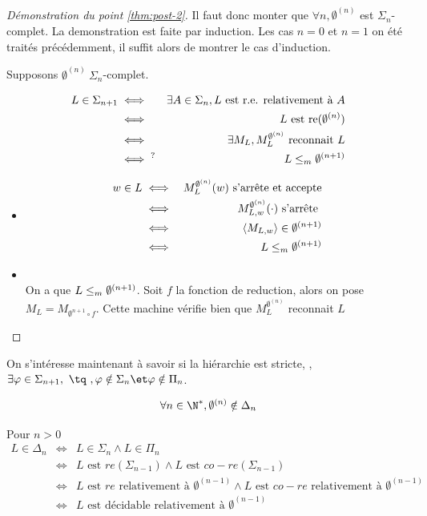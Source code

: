 \begin{proof}[Démonstration du point \ref{thm:post-2}]
	Il faut donc monter que $\forall n, \emptyset^{(n)}$ est $\Sigma_n$-complet.
	La demonstration est faite par induction. Les cas $n =0$ et $n=1$ on été traités précédemment, il suffit alors de montrer le cas d'induction.

	Supposons $\emptyset^{(n)} \ \Sigma_n$-complet.

	\begin{eqnarray*}
		L \in \Sigma_{n+1} &\iff& \exists A \in \Sigma_n, L \text { est r.e. relativement à } A \\
		&\iff& L \text{ est re}(\emptyset^{(n)})\\
		&\iff& \exists M_L, M_L^{\emptyset^{(n)}} \text { reconnait } L \\
		&\iff^? & L \leq_m \emptyset^{(n + 1)}
	\end{eqnarray*}

	\begin{itemize}
		\item \bimpLR
		      \begin{eqnarray*}
			      w \in  L  &\iff&  M_L^{\emptyset^{(n)}}(w) \text{ s'arrête et accepte} \\
			      &\iff&  M_{L,w}^{\emptyset^{(n)}}(\cdot) \text{ s'arrête } \\
			      &\iff&  \left\langle M_{L,w}\right\rangle \in \emptyset^{(n+1)} \\
			      &\iff&  L \leq_m  \emptyset^{(n+1)}
		      \end{eqnarray*}
		\item \bimpRL \\
		      On a que $L \leq_m \emptyset^{(n+1)}$. Soit $f$ la fonction de reduction, alors on pose
		      $M_L = M_{\emptyset^{n+1} \circ f}$. Cette machine vérifie bien que $M_L^{\emptyset^{(n)}}$ reconnait  $L$
	\end{itemize}
\end{proof}



On s'intéresse maintenant à savoir si la hiérarchie est stricte, \ie, $\exists \phi \in \Sigma_{n+1}, \text{ \tq }, \phi \notin \Sigma_n \et \phi \notin \Pi_n$.


\begin{prop}
	$$\forall n \in \N^*, \emptyset^{(n)} \notin \Delta_n$$
\end{prop}


\begin{remarque}
	Pour $n > 0$
	\begin{eqnarray*}
		L \in \Delta_n &\iff& L \in \Sigma_n \land L \in \Pi_n \\
		&\iff& L \text{ est } re(\Sigma_{n-1}) \land L \text{ est } co-re(\Sigma_{n-1})\\
		&\iff& L \text{ est } re \text{ relativement à } \emptyset^{(n-1)} \land  L \text{ est } co-re \text{ relativement à } \emptyset^{(n-1)} \\
		&\iff& L \text{ est décidable relativement à } \emptyset^{(n-1)}
	\end{eqnarray*}
\end{remarque}

